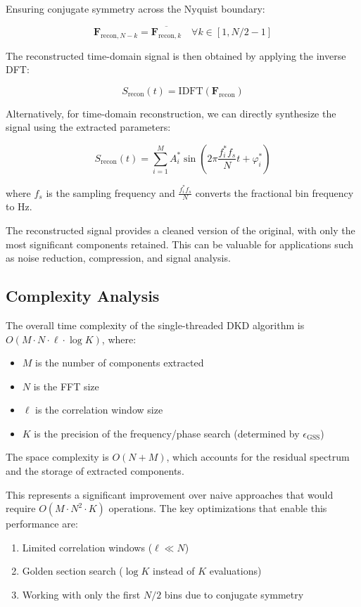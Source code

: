 \documentclass[11pt,twoside]{report}
\numberwithin{thm}{section}
\numberwithin{equation}{section}
\begin{document}
Ensuring conjugate symmetry across the Nyquist boundary:

\begin{equation}
\mathbf{F}_{\text{recon},N-k} = \overline{\mathbf{F}_{\text{recon},k}} \quad \forall k \in [1, N/2-1]
\end{equation}

The reconstructed time-domain signal is then obtained by applying the inverse DFT:

\begin{equation}
S_{\text{recon}}(t) = \text{IDFT}(\mathbf{F}_{\text{recon}})
\end{equation}

Alternatively, for time-domain reconstruction, we can directly synthesize the signal using the extracted parameters:

\begin{equation}
S_{\text{recon}}(t) = \sum_{i=1}^{M} A_i^* \sin(2\pi \frac{f_i^* f_s}{N} t + \varphi_i^*)
\end{equation}

where $f_s$ is the sampling frequency and $\frac{f_i^* f_s}{N}$ converts the fractional bin frequency to Hz.

The reconstructed signal provides a cleaned version of the original, with only the most significant components retained. This can be valuable for applications such as noise reduction, compression, and signal analysis.

\subsection{Complexity Analysis}

The overall time complexity of the single-threaded DKD algorithm is $O(M \cdot N \cdot \ell \cdot \log K)$, where:
\begin{itemize}
    \item $M$ is the number of components extracted
    \item $N$ is the FFT size
    \item $\ell$ is the correlation window size
    \item $K$ is the precision of the frequency/phase search (determined by $\epsilon_{\text{GSS}}$)
\end{itemize}

The space complexity is $O(N + M)$, which accounts for the residual spectrum and the storage of extracted components.

This represents a significant improvement over naive approaches that would require $O(M \cdot N^2 \cdot K)$ operations. The key optimizations that enable this performance are:
\begin{enumerate}
    \item Limited correlation windows ($\ell \ll N$)
    \item Golden section search ($\log K$ instead of $K$ evaluations)
    \item Working with only the first $N/2$ bins due to conjugate symmetry
\end{enumerate}
\end{document}
